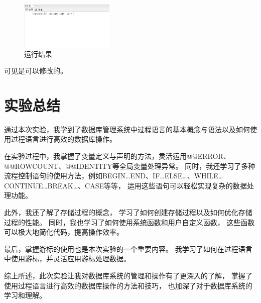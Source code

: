 \documentclass[a4paper,twoside]{article}
\begin{document}
\begin{spacing}{1.2}
\begin{enumerate}
\begin{figure}[h]
\begin{subfigure}{0.4\textwidth}
    \end{subfigure}
  \end{figure}
  \inputminted[firstline=285,lastline=310]{sql}{../code/1.sql}
  \begin{figure}[h]
    \centering
    \caption{运行结果}
    \includegraphics[width=0.4\textwidth]{images/13.png}
  \end{figure}
  可见是可以修改的。
\end{enumerate}

\section{实验总结}

通过本次实验，我学到了数据库管理系统中过程语言的基本概念与语法以及如何使用过程语言进行高效的数据库操作。

在实验过程中，我掌握了变量定义与声明的方法，灵活运用@@ERROR、@@ROWCOUNT、@@IDENTITY等全局变量处理异常。
同时，我还学习了多种流程控制语句的使用方法，例如BEGIN…END、IF…ELSE…、WHILE…CONTINUE…BREAK…、CASE等等，
运用这些语句可以轻松实现复杂的数据处理功能。

此外，我还了解了存储过程的概念，
学习了如何创建存储过程以及如何优化存储过程的性能。
同时，我也学习了如何使用系统函数和用户自定义函数，
这些函数可以极大地简化代码，提高操作效率。

最后，掌握游标的使用也是本次实验的一个重要内容。
我学习了如何在过程语言中使用游标，并灵活应用游标处理数据。

综上所述，此次实验让我对数据库系统的管理和操作有了更深入的了解，
掌握了使用过程语言进行高效的数据库操作的方法和技巧，
也加深了对于数据库系统的学习和理解。

\end{spacing}
\end{document}
